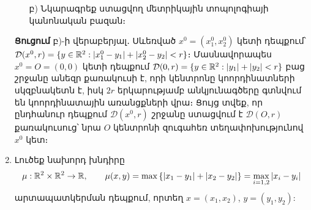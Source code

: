 \begin{enumerate}[label=\thesection.\arabic*.]
\begin{enumerate}
\item[բ)] Նկարագրեք ստացվող մետրիկային տոպոլոգիայի կանոնական բազան։
\end{enumerate}

\par \textbf{Ցուցում} բ)-ի վերաբերյալ․ Սևեռված $x^0 = (x_1^0, x_2^0)$ կետի դեպքում՝ $\mathcal{D}(x^0, r) = \{y \in \R^2 : |x_1^0-y_1|+|x_2^0-y_2|<r\}$։ Մասնավորապես $x^0=O=(0,0)$ կետի դեպքում $\mathcal{D}(0, r) = \{y\in\R^2 : |y_1|+|y_2|<r\}$ բաց շրջանը անեզր քառակուսի է, որի կենտրոնը կոորդինատների սկզբնակետն է, իսկ $2r$ երկարությամբ անկյունագծերը գտնվում են կոորդինատային առանցքների վրա։ Ցույց տվեք, որ ընդհանուր դեպքում $\mathcal{D}(x^0, r)$ շրջանը ստացվում է $\mathcal{D}(O, r)$ քառակուսուց՝ նրա $O$ կենտրոնի զուգահեռ տեղափոխությունով $x^0$ կետ։

\begin{center}
\end{center}


\item Լուծեք նախորդ խնդիրը
\[
\mu : \mathbb{R}^2 \times \mathbb{R}^2 \to \mathbb{R}, 
\qquad 
\mu(x, y) = \max\left\{ |x_1-y_1| + |x_2-y_2| \right\}
= \max_{i=1, 2} |x_i-y_i| 
\]
արտապատկերման դեպքում, որտեղ $x=(x_1,x_2)$, $y=(y_1, y_2)$:



\end{enumerate}
